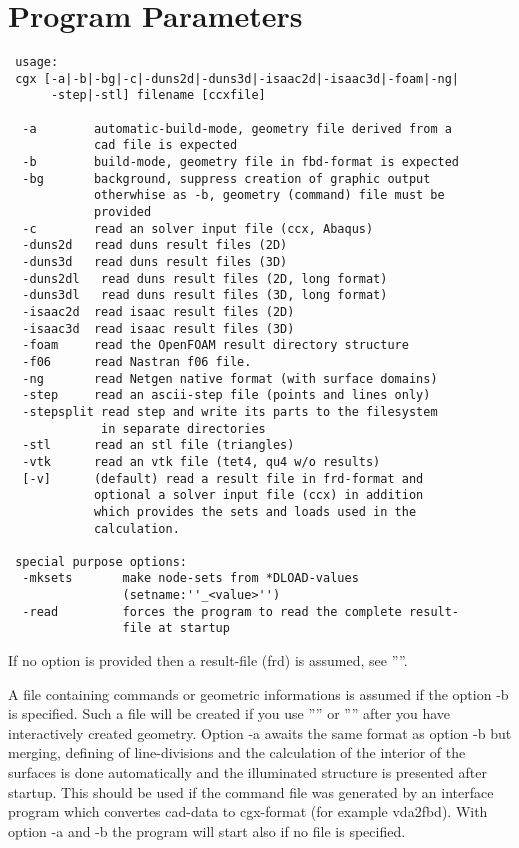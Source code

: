 \documentclass{article}
\begin{document}
\section{\label{Program Parameters}Program Parameters}
\begin{verbatim}
 usage:
 cgx [-a|-b|-bg|-c|-duns2d|-duns3d|-isaac2d|-isaac3d|-foam|-ng|
      -step|-stl] filename [ccxfile]

  -a        automatic-build-mode, geometry file derived from a 
            cad file is expected
  -b        build-mode, geometry file in fbd-format is expected
  -bg       background, suppress creation of graphic output
            otherwhise as -b, geometry (command) file must be
            provided
  -c        read an solver input file (ccx, Abaqus)              
  -duns2d   read duns result files (2D)                                  
  -duns3d   read duns result files (3D)
  -duns2dl   read duns result files (2D, long format)
  -duns3dl   read duns result files (3D, long format)
  -isaac2d  read isaac result files (2D)                                  
  -isaac3d  read isaac result files (3D)                                  
  -foam     read the OpenFOAM result directory structure
  -f06      read Nastran f06 file.    
  -ng       read Netgen native format (with surface domains)    
  -step     read an ascii-step file (points and lines only)                                  
  -stepsplit read step and write its parts to the filesystem
             in separate directories
  -stl      read an stl file (triangles)                                  
  -vtk      read an vtk file (tet4, qu4 w/o results)                                 
  [-v]      (default) read a result file in frd-format and
            optional a solver input file (ccx) in addition 
            which provides the sets and loads used in the
            calculation.

 special purpose options:                                               
  -mksets       make node-sets from *DLOAD-values 
                (setname:''_<value>'')
  -read         forces the program to read the complete result-
                file at startup
\end{verbatim}
If no option is provided then a result-file (frd) is assumed, see ''''.

A file containing commands or geometric informations is assumed if the option -b is specified. Such a file will be created if you use '''' or '''' after you have interactively created geometry. Option -a awaits the same format as option -b but merging, defining of line-divisions and the calculation of the interior of the surfaces is done automatically and the illuminated structure is presented after startup. This should be used if the command file was generated by an interface program which convertes cad-data to cgx-format (for example vda2fbd). With option -a and -b the program will start also if no file is specified. 
\end{document}
